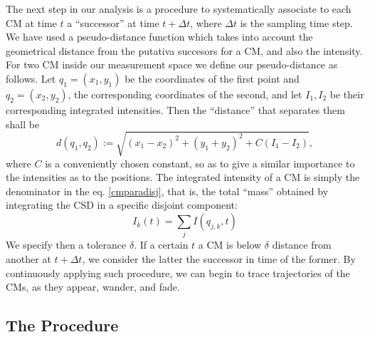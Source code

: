 \documentclass{article}
\begin{document}
The next step in our analysis is a procedure to systematically associate to each CM at time $t$ a ``successor'' at time $t+\Delta t$, where $\Delta t$ is the sampling time step. We have used a pseudo-distance function which takes into account the geometrical distance from the putativa succesors for a CM, and also the intensity. For two CM inside our measurement space we define our pseudo-distance as follows. Let $q_1=(x_1, y_1)$ be the coordinates of the first point and $q_2=(x_2,y_2)$, the corresponding coordinates of the second, and let $I_1, I_2$ be their corresponding integrated intensities. Then the ``distance'' that separates them shall be 
\begin{equation}\label{pseudodist}
d(q_1,q_2):=\sqrt{(x_1-x_2)^2+(y_1+y_2)^2+C(I_1-I_2)},
\end{equation}
where $C$ is a conveniently chosen constant, so as to give a similar importance to the intensities as to the positions.
The integrated intensity of a CM is simply the denominator in the eq. \ref{cmparadisj}, that is, the total ``mass'' obtained by integrating the CSD in a specific disjoint component:
\begin{equation}
I_k(t)=\sum_j I (q_{j,k}, t)
\end{equation}
We specify then a tolerance $\delta$. If a certain $t$ a CM is below $\delta$ distance from another at $t+\Delta t$, we consider the latter the successor in time of the former. By continuously applying such procedure, we can begin to trace trajectories of the CMs, as they appear, wander, and fade. 

 
 \subsection{The Procedure}
 
\end{document}
